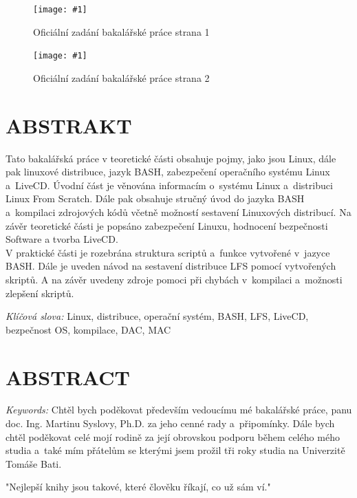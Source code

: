 \documentclass[a4paper,12pt]{article}
\newcommand{\nm}[1]{\clearpage\section*{\uppercase{#1}}}	%
\newcommand{\nns}[1]{\section*{\uppercase{#1}}}		%
\newcommand{\obr}[3]{%
	\begin{figure}[h]
	\center\texttt{[image: \#1]}
	\caption{#3}
	\end{figure}
	}
\newcommand{\ofZadani}[2]{%
	\begin{figure}[h]
	\center\texttt{[image: \#1]}
	\caption{#2}
	\end{figure}
	}
\begin{document}
\clearpage
\thispagestyle{empty}
\ofZadani{./img/ofZadani/ofZadaniStr1.png}{Oficiální zadání bakalářské práce strana 1}
\clearpage
\thispagestyle{empty}
\ofZadani{./img/ofZadani/ofZadaniStr2.png}{Oficiální zadání bakalářské práce strana 2}
\clearpage
\thispagestyle{empty}
\voffset=-1.61cm\evensidemargin=0.96cm\oddsidemargin=0.96cm\headsep=1cm\headheight=0.5cm\setlength{\parskip}{3pt}\textheight=248mm\textwidth=155mm
\nm{\uppercase{Abstrakt}}
\vspace{1cm}
Tato bakalářská práce v teoretické části obsahuje pojmy, jako jsou Linux, dále pak linuxové distribuce, jazyk BASH, zabezpečení operačního systému Linux a~LiveCD. Úvodní část je věnována informacím o~systému Linux a~distribuci Linux From Scratch. Dále pak obsahuje stručný úvod do jazyka BASH a~kompilaci zdrojových kódů včetně možností sestavení Linuxových distribucí. Na závěr teoretické části je popsáno zabezpečení Linuxu, hodnocení bezpečnosti Software a tvorba LiveCD.\\

V praktické části je rozebrána struktura scriptů a~funkce vytvořené v~jazyce BASH. Dále je uveden návod na sestavení distribuce LFS pomocí vytvořených skriptů. A na závěr uvedeny zdroje pomoci při chybách v~kompilaci a~možnosti zlepšení skriptů.
\vspace{1cm}

\emph{Klíčová slova:} Linux, distribuce, operační systém, BASH, LFS, LiveCD, bezpečnost OS, kompilace, DAC, MAC

\vspace{3cm}

\nns{\uppercase{Abstract}}

\vspace{1cm}

\emph{Keywords:}
\clearpage
\thispagestyle{empty}
Chtěl bych poděkovat především vedoucímu mé bakalářské práce, panu doc. Ing. Martinu Syslovy, Ph.D. za jeho cenné rady a~připomínky.
Dále bych chtěl poděkovat celé mojí rodině za její obrovskou podporu během celého mého studia a~také mím přátelům se kterými jsem prožil tři roky studia na Univerzitě Tomáše Bati.

\vspace{3cm}
"Nejlepší knihy jsou takové, které člověku říkají, co už sám ví."\\
\end{document}
